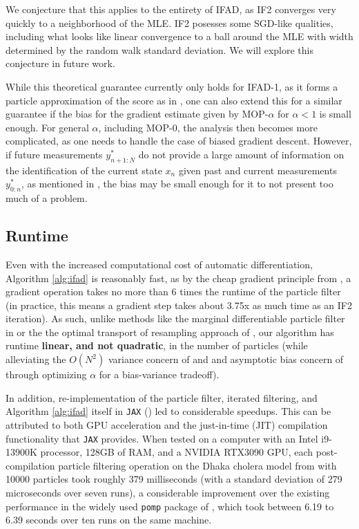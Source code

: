 \documentclass{article}
\begin{document}
We conjecture that this applies to the entirety of IFAD, as IF2 converges very quickly to a neighborhood of the MLE. IF2 posesses some SGD-like qualities, including what looks like linear convergence to a ball around the MLE with width determined by the random walk standard deviation. We will explore this conjecture in future work.

While this theoretical guarantee currently only holds for IFAD-1, as it forms a particle approximation of the score as in \cite{poyiadjis11}, one can also extend this for a similar guarantee if the bias for the gradient estimate given by MOP-$\alpha$ for $\alpha < 1$ is small enough. For general $\alpha$, including MOP-0, the analysis then becomes more complicated, as one needs to handle the case of biased gradient descent. However, if future measurements $y_{n+1:N}^*$ do not provide a large amount of information on the identification of the current state $x_n$ given past and current measurements $y_{0:n}^*$, as mentioned in \cite{corenflos21}, the bias may be small enough for it to not present too much of a problem.

\subsection{Runtime}

Even with the increased computational cost of automatic differentiation, Algorithm \ref{alg:ifad} is reasonably fast, as by the cheap gradient principle from \cite{kakade2019provably}, a gradient operation takes no more than 6 times the runtime of the particle filter (in practice, this means a gradient step takes about 3.75x as much time as an IF2 iteration). As such, unlike methods like the marginal differentiable particle filter in \cite{scibior2021dpf} or the the optimal transport of resampling approach of \cite{corenflos21}, our algorithm has runtime \textbf{linear, and not quadratic}, in the number of particles (while alleviating the $O(N^2)$ variance concern of \cite{poyiadjis11} and \cite{corenflos2021ot} and asymptotic bias concern of \cite{blei2018vsmc} through optimizing $\alpha$ for a bias-variance tradeoff). 

In addition, re-implementation of the particle filter, iterated filtering, and Algorithm \ref{alg:ifad} itself in \texttt{JAX} (\cite{jax2018github}) led to considerable speedups. This can be attributed to both GPU acceleration and the just-in-time (JIT) compilation functionality that \texttt{JAX} provides. When tested on a computer with an Intel i9-13900K processor, 128GB of RAM, and a NVIDIA RTX3090 GPU, each post-compilation particle filtering operation on the Dhaka cholera model from \cite{king08} with 10000 particles took roughly 379 milliseconds (with a standard deviation of 279 microseconds over seven runs), a considerable improvement over the existing performance in the widely used \texttt{pomp} package of \cite{king16}, which took between 6.19 to 6.39 seconds over ten runs on the same machine.
\end{document}
